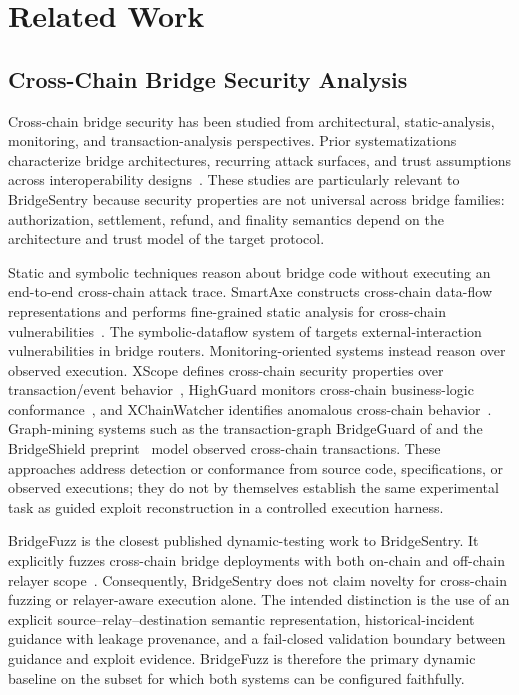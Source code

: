 
\section{Related Work}\label{sec:related}

\subsection{Cross-Chain Bridge Security Analysis}

Cross-chain bridge security has been studied from architectural, static-analysis, monitoring, and transaction-analysis perspectives. Prior systematizations characterize bridge architectures, recurring attack surfaces, and trust assumptions across interoperability designs~\citep{augusto2024sok,lee2023sok,duan2023attacks,notland2026sok}. These studies are particularly relevant to BridgeSentry because security properties are not universal across bridge families: authorization, settlement, refund, and finality semantics depend on the architecture and trust model of the target protocol.

Static and symbolic techniques reason about bridge code without executing an end-to-end cross-chain attack trace. SmartAxe constructs cross-chain data-flow representations and performs fine-grained static analysis for cross-chain vulnerabilities~\citep{liao2024smartaxe}. The symbolic-dataflow system of \citet{zhou2025bridgeguard} targets external-interaction vulnerabilities in bridge routers. Monitoring-oriented systems instead reason over observed execution. XScope defines cross-chain security properties over transaction/event behavior~\citep{zhang2022xscope}, HighGuard monitors cross-chain business-logic conformance~\citep{eshghie2024highguard}, and XChainWatcher identifies anomalous cross-chain behavior~\citep{augusto2025xchainwatcher}. Graph-mining systems such as the transaction-graph BridgeGuard of \citet{wu2025safeguarding} and the BridgeShield preprint~\citep{lin2025bridgeshield} model observed cross-chain transactions. These approaches address detection or conformance from source code, specifications, or observed executions; they do not by themselves establish the same experimental task as guided exploit reconstruction in a controlled execution harness.

BridgeFuzz is the closest published dynamic-testing work to BridgeSentry. It explicitly fuzzes cross-chain bridge deployments with both on-chain and off-chain relayer scope~\citep{winkler2026bridgefuzz}. Consequently, BridgeSentry does not claim novelty for cross-chain fuzzing or relayer-aware execution alone. The intended distinction is the use of an explicit source--relay--destination semantic representation, historical-incident guidance with leakage provenance, and a fail-closed validation boundary between guidance and exploit evidence. BridgeFuzz is therefore the primary dynamic baseline on the subset for which both systems can be configured faithfully.

